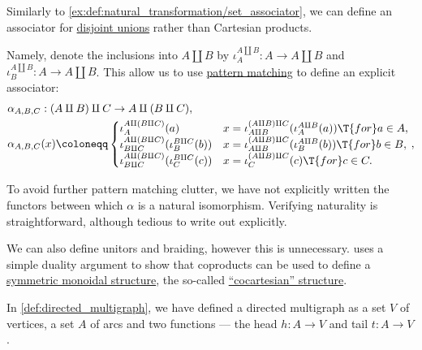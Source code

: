 \begin{example}
\begin{thmenum}
     Similarly to \cref{ex:def:natural_transformation/set_associator}, we can define an associator for \hyperref[def:disjoint_union]{disjoint unions} rather than Cartesian products.

    Namely, denote the inclusions into \( A \amalg B \) by \( \iota_A^{A \amalg B}: A \to A \amalg B \) and \( \iota_B^{A \amalg B}: A \to A \amalg B \). This allow us to use \hyperref[con:evaluation]{pattern matching} to define an explicit associator:
    \begin{equation*}
      \begin{aligned}
        &\alpha_{A, B, C}: (A \amalg B) \amalg C \to A \amalg (B \amalg C), \\
        &\alpha_{A, B, C}(x) \coloneqq \begin{cases}
          \iota_A^{A \amalg (B \amalg C)}(a)                                  &x = \iota_{A \amalg B}^{(A \amalg B) \amalg C}(\iota_A^{A \amalg B}(a)) \T{for} a \in A, \\
          \iota_{B \amalg C}^{A \amalg (B \amalg C)}(\iota_B^{B \amalg C}(b)) &x = \iota_{A \amalg B}^{(A \amalg B) \amalg C}(\iota_B^{A \amalg B}(b)) \T{for} b \in B, \\
          \iota_{B \amalg C}^{A \amalg (B \amalg C)}(\iota_C^{B \amalg C}(c)) &x = \iota_C^{(A \amalg B) \amalg C}(c) \T{for} c \in C.
        \end{cases},
      \end{aligned}
    \end{equation*}

    To avoid further pattern matching clutter, we have not explicitly written the functors between which \( \alpha \) is a natural isomorphism. Verifying naturality is straightforward, although tedious to write out explicitly.

    We can also define unitors and braiding, however this is unnecessary.  uses a simple duality argument to show that coproducts can be used to define a \hyperref[def:symmetric_monoidal_category]{symmetric monoidal structure}, the so-called \hyperref[def:cocartesian_monoidal_category]{\enquote{cocartesian} structure}.

     In \cref{def:directed_multigraph}, we have defined a directed multigraph as a set \( V \) of vertices, a set \( A \) of arcs and two functions --- the head \( h: A \to V \) and tail \( t: A \to V \).


\end{thmenum}
\end{example}
